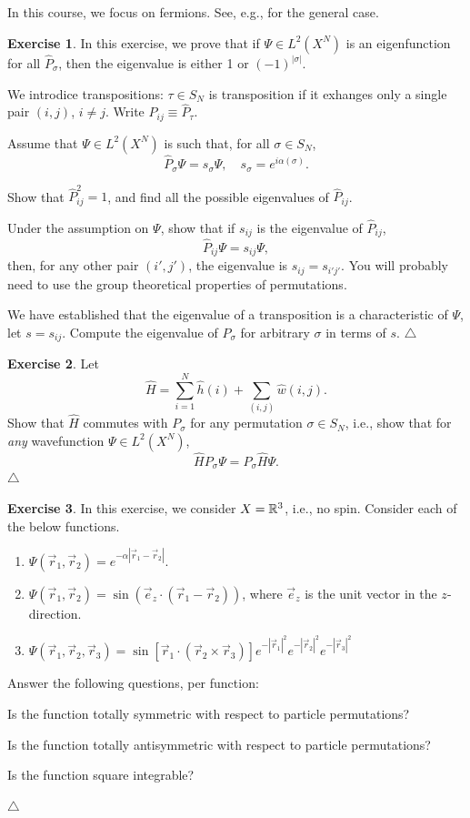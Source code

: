\documentclass{report}
\theoremstyle{plain}
\theoremstyle{definition}
\newtheorem{exerc}{Exercise}[chapter]
\newcommand\xqed[1]{%
  \leavevmode\unskip\penalty9999 \hbox{}\nobreak\hfill
  \quad\hbox{#1}}
\newcommand\demo{\xqed{$\triangle$}}
\newenvironment{exercise}{\bigskip\begin{exerc}}{\demo\end{exerc}\bigskip}
\begin{document}
In this course, we focus on fermions. See, e.g.,
\cite{GRH} for the general case.

\begin{exercise}
  In this exercise, we prove that if $\Psi\in L^2(X^N)$ is an
  eigenfunction for all $\hat{P}_\sigma$, then the eigenvalue is
  either 1 or $(-1)^{|\sigma|}$.

  We introdice transpositions: $\tau \in S_N$ is transposition if it
  exhanges only a single pair $(i,j)$, $i\neq j$. Write $\hat{P}_{ij}
  \equiv \hat{P}_\tau$.

  Assume that $\Psi\in L^2(X^N)$ is such that, for all $\sigma\in
  S_N$,
  \[ \hat{P}_\sigma \Psi = s_\sigma \Psi, \quad s_\sigma =
  e^{i\alpha(\sigma)}. \]

  Show that $\hat{P}_{ij}^2 = 1$, and find all the possible eigenvalues of $\hat{P}_{ij}$.
  
  Under the assumption on $\Psi$, show that if $s_{ij}$ is the
  eigenvalue of $\hat{P}_{ij}$, 
  \[ \hat{P}_{ij} \Psi = s_{ij} \Psi, \]
  then, for any other pair $(i',j')$, the eigenvalue is $s_{ij} =
  s_{i'j'}$. You will probably need to use the group theoretical
  properties of permutations.

  We have established that the eigenvalue of a transposition is a
  characteristic of $\Psi$, let $s = s_{ij}$. Compute the
  eigenvalue of $P_\sigma$ for arbitrary $\sigma$ in terms of $s$.
\end{exercise}

\begin{exercise}
  Let
  \[ \hat{H} = \sum_{i=1}^N \hat{h}(i) + \sum_{(i,j)} \hat{w}(i,j).\]
  Show that $\hat{H}$ commutes with $P_\sigma$ for any
  permutation $\sigma \in S_N$, i.e., show that for \emph{any} wavefunction
  $\Psi \in L^2(X^N)$, 
  \begin{equation}
    \hat{H}P_\sigma \Psi = P_\sigma \hat{H} \Psi.
  \end{equation}
\end{exercise}

\begin{exercise}
  In this exercise, we consider $X = \mathbb{R}^3$, i.e., no spin.
  Consider each of the below functions.
  \begin{enumerate}
  \item 
    $\Psi(\vec{r}_1,\vec{r}_2) = e^{-\alpha|\vec{r}_1 - \vec{r}_2|}$.
  \item
    $\Psi(\vec{r}_1, \vec{r}_2) = \sin(\vec{e}_z \cdot(\vec{r}_1 -
    \vec{r}_2))$, where $\vec{e}_z$ is the unit vector in the
    $z$-direction.
  \item
    $\Psi(\vec{r}_1,\vec{r}_2,\vec{r}_3) =
    \sin[\vec{r}_1\cdot(\vec{r}_2\times\vec{r}_3)] e^{-|\vec{r}_1|^2}
    e^{-|\vec{r}_2|^2} e^{-|\vec{r}_3|^2}$
  \end{enumerate}
  Answer the following questions, per function:

  Is the function totally symmetric with respect to particle permutations?

  Is the function totally antisymmetric with respect to particle
  permutations? 

  Is the function square integrable?
  
\end{exercise}
\end{document}
